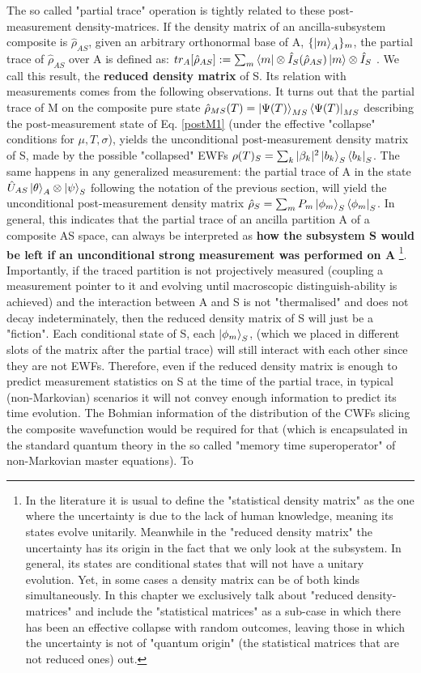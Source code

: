 \documentclass[11pt, a4paper]{article} %
\begin{document}
The so called "partial trace" operation is tightly related to these post-measurement density-matrices. If the density matrix of an ancilla-subsystem composite is $\hat{\rho}_{AS}$, given an arbitrary orthonormal base of A, $\{\ket{m}_A\}_m$, the partial trace of $\hat{\rho}_{AS}$ over A is defined as: $tr_{A}[\hat{\rho}_{AS}] := \sum_m \bra{m}\otimes \hat{I}_S(\hat{\rho}_{AS})\ket{m}\otimes \hat{I}_S$ \cite{Generalized, Durr}. We call this result, the {\bf reduced density matrix} of S. Its relation with measurements comes from the following observations. It turns out that the partial trace of M on the composite pure state $\hat{\rho}_{MS}(T)=\ket{\Psi(T)}_{MS}\bra{\Psi(T)}_{MS}$ describing the post-measurement state of Eq. \eqref{postM1} (under the effective "collapse" conditions for $\mu,T,\sigma$), yields the unconditional post-measurement density matrix of S, made by the possible "collapsed" EWFs $\rho(T)_S=\sum_k |\beta_k|^2\ket{b_k}_S\bra{b_k}_S$. The same happens in any generalized measurement: the partial trace of A in the state $\hat{U}_{AS}\ket{\theta}_A\otimes\ket{\psi}_S$ following the notation of the previous section, will yield the unconditional post-measurement density matrix $\hat{\rho}_S=\sum_m P_m \ket{\phi_m}_S\bra{\phi_m}_S$. In general, this indicates that the partial trace of an ancilla partition A of a composite AS space, can always be interpreted as {\bf how the subsystem S would be left if an unconditional strong measurement was performed on A }\cite{Generalized}\footnote{In the literature \cite{density} it is usual to define the "statistical density matrix" as the one where the uncertainty is due to the lack of human knowledge, meaning its states evolve unitarily. Meanwhile in the "reduced density matrix" the uncertainty has its origin in the fact that we only look at the subsystem. In general, its states are conditional states that will not have a unitary evolution. Yet, in some cases a density matrix can be of both kinds simultaneously. In this chapter we exclusively talk about "reduced density-matrices" and include the "statistical matrices" as a sub-case in which there has been an effective collapse with random outcomes, leaving those in which the uncertainty is not of "quantum origin" (the statistical matrices that are not reduced ones) out.}. Importantly, if the traced partition is not projectively measured (coupling a measurement pointer to it and evolving until macroscopic distinguish-ability is achieved) and the interaction between A and S is not "thermalised" and does not decay indeterminately, then the reduced density matrix of S will just be a "fiction". Each conditional state of S, each $\ket{\phi_m}_S$, (which we placed in different slots of the matrix after the partial trace) will still interact with each other since they are not EWFs. Therefore, even if the reduced density matrix is enough to predict measurement statistics on S at the time of the partial trace, in typical (non-Markovian) scenarios it will not convey enough information to predict its time evolution. The Bohmian information of the distribution of the CWFs slicing the composite wavefunction would be required for that (which is encapsulated in the standard quantum theory in the so called "memory	time superoperator" \cite{WisemanSSE} of non-Markovian master equations). To 
\end{document}
